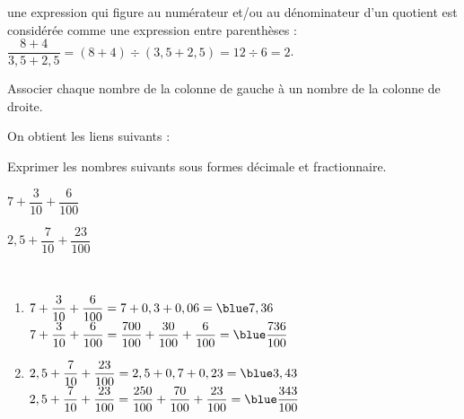 \begin{remarque}
   une expression qui figure au numérateur et/ou au dénominateur d'un quotient est considérée comme une expression entre parenthèses : \\
   $\dfrac{8+4}{3,5+2,5} = (8+4)\div(3,5+2,5) =12\div6 =2$.
\end{remarque}


\exercicesbase

\begin{colonne*exercice}

\begin{exercice} %
   Associer chaque nombre de la colonne de gauche à un nombre de la colonne de droite. \\
\end{exercice}

\begin{corrige}
   On obtient les liens suivants : \\
\end{corrige}

\bigskip


\begin{exercice} %
   Exprimer les nombres suivants sous formes décimale et fractionnaire. \smallskip
   \begin{colenumerate}{2}
      \item $7+\dfrac{3}{10}+\dfrac{6}{100}$
      \item $2,5+\dfrac{7}{10}+\dfrac{23}{100}$
   \end{colenumerate}
\end{exercice}

\begin{corrige}
   \ \\ [-5mm]
   \begin{enumerate}
      \item $7+\dfrac{3}{10}+\dfrac{6}{100} = 7+0,3+0,06 ={\blue 7,36}$ \\ [2mm]
         $7+\dfrac{3}{10}+\dfrac{6}{100} =\dfrac{700}{100}+\dfrac{30}{100}+\dfrac{6}{100} ={\blue \dfrac{736}{100}}$ \medskip
      \item $2,5+\dfrac{7}{10}+\dfrac{23}{100} = 2,5+0,7+0,23 ={\blue 3,43}$ \\ [2mm]
         $2,5+\dfrac{7}{10}+\dfrac{23}{100} =\dfrac{250}{100}+\dfrac{70}{100}+\dfrac{23}{100} ={\blue \dfrac{343}{100}}$
   \end{enumerate}
\end{corrige}


\end{colonne*exercice}
